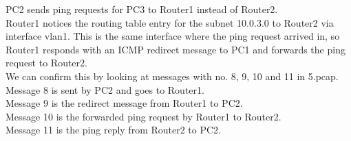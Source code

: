 PC2 sends ping requests for PC3 to Router1 instead of Router2. \\
Router1 notices the routing table entry for the subnet 10.0.3.0 to Router2 via interface vlan1. This is the same interface where the ping request arrived in, so Router1 responds with an ICMP redirect message to PC1 and forwards the ping request to Router2.\\

We can confirm this by looking at messages with no. 8, 9, 10 and 11 in 5.pcap. \\
	Message 8 is sent by PC2 and goes to Router1. \\
	Message 9 is the redirect message from Router1 to PC2.\\
	Message 10 is the forwarded ping request by Router1 to Router2.\\
	Message 11 is the ping reply from Router2 to PC2.\\